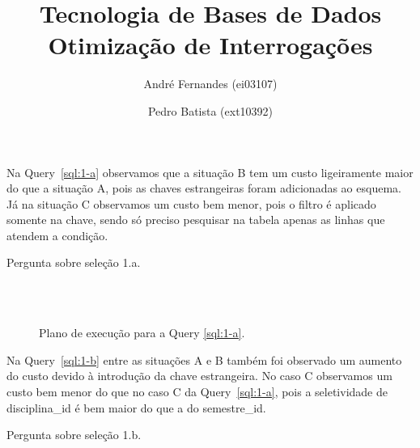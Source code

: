 \documentclass[a4paper,12pt]{article}
\title{Tecnologia de Bases de Dados\\
Otimização de Interrogações}
\author{André Fernandes (ei03107) \and Pedro Batista (ext10392)}
\begin{document}
\maketitle

Na Query~\ref{sql:1-a} observamos que a situação B tem um custo
ligeiramente maior do que a situação A, pois as chaves estrangeiras foram adicionadas ao esquema.
Já na situação C observamos um custo bem menor, pois o filtro é aplicado
somente na chave, sendo só preciso pesquisar na tabela apenas as linhas que
atendem a condição.

\begin{program}
   
   \caption{Pergunta sobre seleção 1.a.}
   \label{sql:1-a}
\end{program}

\begin{figure}[thp]
   \begin{center}
      \\
      \\
   \end{center}
   \caption{Plano de execução para a Query \ref{sql:1-a}.}
   \label{fig:plano_1-a}
\end{figure}


Na Query~\ref{sql:1-b} entre as situações A e B também foi observado um aumento do custo
devido à introdução da chave estrangeira. No caso C observamos um custo bem menor
do que no caso C da Query~\ref{sql:1-a}, pois a seletividade de disciplina\_id
é bem maior do que a do semestre\_id.

\begin{program}
   
   \caption{Pergunta sobre seleção 1.b.}
   \label{sql:1-b}
\end{program}
\end{document}
